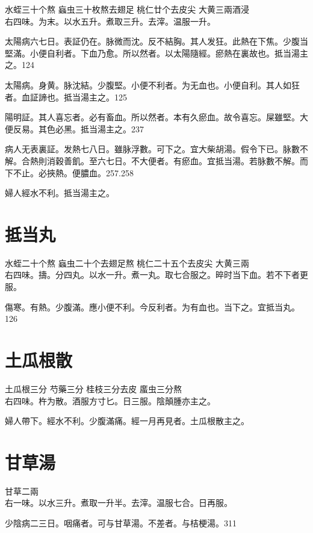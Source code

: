 水蛭{\scriptsize 三十个熬} 蝱虫{\scriptsize 三十枚熬去翅足} 桃仁{\scriptsize 廿个去皮尖} 大黄{\scriptsize 三兩酒浸}\\
右四味。为末。以水五升。煮取三升。去滓。温服一升。{\dengben}

太陽病六七日。表証仍在。脉微而沈。反不結胸。其人发狂。此熱在下焦。少腹当堅滿。小便自利者。下血乃愈。所以然者。以太陽隨經。瘀熱在裏故也。抵当湯主之。124

太陽病。身黄。脉沈結。少腹堅。小便不利者。为无血也。小便自利。其人如狂者。血証諦也。抵当湯主之。125

陽明証。其人喜忘者。必有畜血。所以然者。本有久瘀血。故令喜忘。屎雖堅。大便反易。其色必黑。抵当湯主之。237

病人无表裏証。发熱七八日。雖脉浮數。可下之。{\khaai 宜大柴胡湯。}假令下已。脉數不解。合熱則消穀善飢。至六七日。不大便者。有瘀血。宜抵当湯。若脉數不解。而下不止。必挾熱。便膿血。257.258

婦人經水不利。抵当湯主之。

\section{抵当丸}

水蛭{\scriptsize 二十个熬} 蝱虫{\scriptsize 二十个去翅足熬} 桃仁{\scriptsize 二十五个去皮尖} 大黄{\scriptsize 三兩}\\
右四味。擣。分四丸。以水一升。煮一丸。取七合服之。晬时当下血。若不下者更服。

傷寒。有熱。少腹滿。應小便不利。今反利者。为有血也。当下之。宜抵当丸。126

\section{土瓜根散}

土瓜根{\scriptsize 三分} 芍藥{\scriptsize 三分} 桂枝{\scriptsize 三分去皮} 䗪虫{\scriptsize 三分熬}\\
右四味。杵为散。酒服方寸匕。日三服。{\khaai 陰顛腫亦主之。}

婦人帶下。經水不利。少腹滿痛。經一月再見者。土瓜根散主之。

\section{甘草湯}

甘草{\scriptsize 二兩}\\
右一味。以水三升。煮取一升半。去滓。温服七合。日再服。

少陰病二三日。咽痛者。可与甘草湯。不差者。与桔梗湯。311

